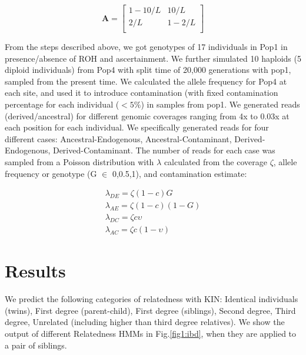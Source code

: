 \documentclass[12pt, letterpaper]{article}
\begin{document}
$$\mathbf{A} = \left[\begin{array}
{rr}
1-10/L & 10/L \\
2/L & 1-2/L  \\
\end{array}\right]
$$

From the steps described above, we got genotypes of 17 individuals in Pop1 in presence/absence of ROH and ascertainment. We further simulated 10 haploids (5 diploid individuals) from Pop4 with split time of 20,000 generations with pop1, sampled from the present time. We calculated the allele frequency for Pop4 at each site, and used it to introduce contamination (with fixed contamination percentage for each individual ($<5\%$) in samples from pop1. We generated reads (derived/ancestral) for different genomic coverages ranging from 4x to 0.03x at each position for each individual. We specifically generated reads for four different cases: Ancestral-Endogenous, Ancestral-Contaminant, Derived-Endogenous, Derived-Contaminant. The number of reads for each case was sampled from a Poisson distribution with $\lambda$ calculated from the coverage $\zeta$, allele frequency or genotype (G $\in$ 0,0.5,1), and contamination estimate:

\begin{align}
    \lambda_{DE} = \zeta (1-c) G\nonumber\\
    \lambda_{AE} = \zeta (1-c) (1-G)\nonumber\\
    \lambda_{DC} = \zeta c \upsilon\nonumber\\
    \lambda_{AC} = \zeta c (1-\upsilon)
\end{align}

\section{Results}

We predict the following categories of relatedness with KIN: Identical individuals (twins), First degree (parent-child), First degree (siblings), Second degree, Third degree, Unrelated (including higher than third degree relatives). We show the output of different Relatedness HMMs in Fig.\ref{fig1:ibd}, when they are applied to a pair of siblings.
\end{document}
